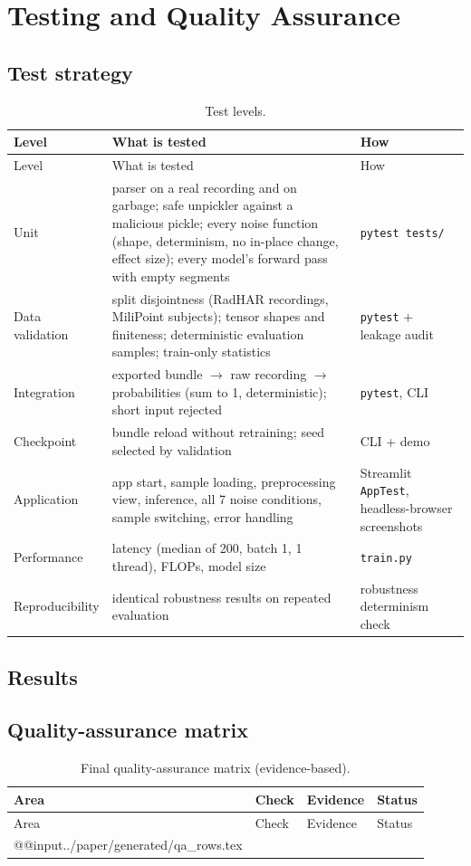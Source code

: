 \chapter{Testing and Quality Assurance}

\section{Test strategy}
\begin{longtable}{L{2.6cm}L{6.6cm}L{4.6cm}}
\caption{Test levels.}\label{tab:testlevels}\\
\toprule
Level & What is tested & How \\
\midrule\endfirsthead
\toprule Level & What is tested & How \\ \midrule\endhead
Unit & parser on a real recording and on garbage; safe unpickler against a malicious pickle; every noise function (shape, determinism, no in-place change, effect size); every model's forward pass with empty segments & \texttt{pytest tests/} \\
Data validation & split disjointness (RadHAR recordings, MiliPoint subjects); tensor shapes and finiteness; deterministic evaluation samples; train-only statistics & \texttt{pytest} + leakage audit \\
Integration & exported bundle $\rightarrow$ raw recording $\rightarrow$ probabilities (sum to 1, deterministic); short input rejected & \texttt{pytest}, CLI \\
Checkpoint & bundle reload without retraining; seed selected by validation & CLI + demo \\
Application & app start, sample loading, preprocessing view, inference, all 7 noise conditions, sample switching, error handling & Streamlit \texttt{AppTest}, headless-browser screenshots \\
Performance & latency (median of 200, batch 1, 1 thread), FLOPs, model size & \texttt{train.py} \\
Reproducibility & identical robustness results on repeated evaluation & robustness determinism check \\
\bottomrule
\end{longtable}

\section{Results}


\section{Quality-assurance matrix}
\begin{longtable}{L{2.5cm}L{5.6cm}L{4.4cm}L{1.4cm}}
\caption{Final quality-assurance matrix (evidence-based).}\label{tab:qa}\\
\toprule
Area & Check & Evidence & Status \\
\midrule\endfirsthead
\toprule Area & Check & Evidence & Status \\ \midrule\endhead
\csname @@input\endcsname ../paper/generated/qa_rows.tex 
\bottomrule
\end{longtable}
